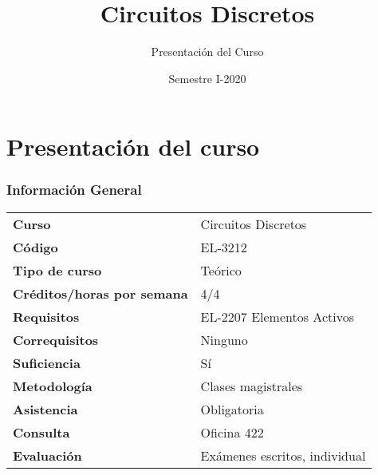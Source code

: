 \title[Circuitos Discretos]{Circuitos Discretos}
\subtitle{Presentación del Curso}
\date{Semestre I-2020}

\section{Presentación del curso}

\begin{frame}[t]
\titlepage
\end{frame}

\begin{frame}[t]
\frametitle{Información General}

\begin{table}
	\centering %
	\begin{tabular}{ll}
	\textbf{Curso} & Circuitos Discretos \\
	\textbf{Código} & EL-3212 \\
	\textbf{Tipo de curso} & Teórico \\
	\textbf{Créditos/horas por semana} & 4/4 \\
	\textbf{Requisitos} & EL-2207 Elementos Activos \\
	\textbf{Correquisitos} & Ninguno \\
	\textbf{Suficiencia} & Sí \\
	\textbf{Metodología} & Clases magistrales \\
	\textbf{Asistencia} & Obligatoria \\
	\textbf{Consulta} & Oficina 422 \\
	\textbf{Evaluación} & Exámenes escritos, individual \\
	\end{tabular}
\end{table}
\end{frame}

